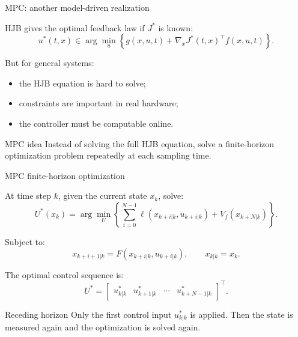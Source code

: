 \documentclass[aspectratio=169]{beamer}
\begin{document}
\begin{frame}{MPC: another model-driven realization}

HJB gives the optimal feedback law if $J^*$ is known:
\[
u^*(t,x)
\in
\arg\min_u
\left\{
g(x,u,t)
+
\nabla_xJ^*(t,x)^\top f(x,u,t)
\right\}.
\]

\vspace{0.25cm}

But for general systems:
\begin{itemize}
    \item the HJB equation is hard to solve;
    \vspace{0.2cm}
    \item constraints are important in real hardware;
    \vspace{0.2cm}
    \item the controller must be computable online.
\end{itemize}

\vspace{0.25cm}

\begin{block}{MPC idea}
\small
Instead of solving the full HJB equation, solve a finite-horizon optimization problem repeatedly at each sampling time.
\end{block}

\end{frame}


\begin{frame}{MPC finite-horizon optimization}

At time step $k$, given the current state $x_k$, solve:
\[
U^*(x_k)
=
\arg\min_U
\left\{
\sum_{i=0}^{N-1}
\ell(x_{k+i|k},u_{k+i|k})
+
V_f(x_{k+N|k})
\right\}.
\]



Subject to:
\[
x_{k+i+1|k}
=
F(x_{k+i|k},u_{k+i|k}),
\qquad
x_{k|k}=x_k .
\]



The optimal control sequence is:
\[
U^*
=
\begin{bmatrix}
u^*_{k|k}&u^*_{k+1|k}&\cdots&u^*_{k+N-1|k}
\end{bmatrix}^\top .
\]



\begin{alertblock}{Receding horizon}
\small
Only the first control input $u^*_{k|k}$ is applied. Then the state is measured again and the optimization is solved again.
\end{alertblock}

\end{frame}
\end{document}
